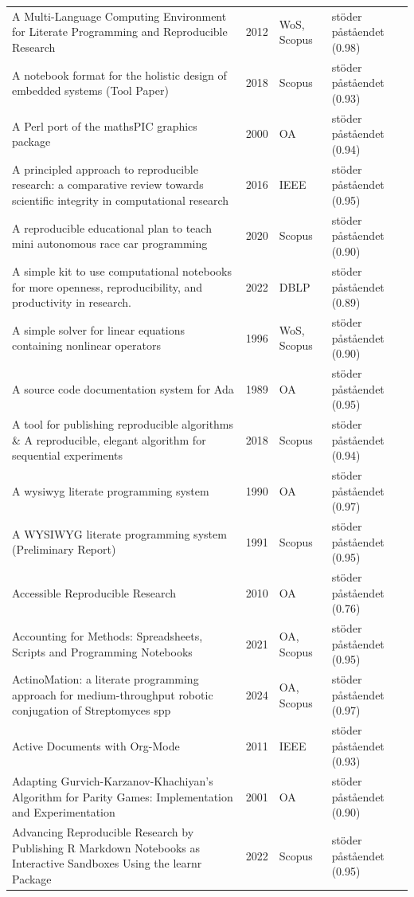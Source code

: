 \begin{longtable}{@{}%
  >{\raggedright\arraybackslash}p{}c%
  >{\raggedright\arraybackslash}p{}%
  >{\raggedright\arraybackslash}p{}@{}}
A Multi-Language Computing Environment for Literate Programming and Reproducible Research & 2012 & WoS, Scopus & stöder påståendet (0.98) \\
A notebook format for the holistic design of embedded systems (Tool Paper) & 2018 & Scopus & stöder påståendet (0.93) \\
A Perl port of the mathsPIC graphics package & 2000 & OA & stöder påståendet (0.94) \\
A principled approach to reproducible research: a comparative review towards scientific integrity in computational research & 2016 & IEEE & stöder påståendet (0.95) \\
A reproducible educational plan to teach mini autonomous race car programming & 2020 & Scopus & stöder påståendet (0.90) \\
A simple kit to use computational notebooks for more openness, reproducibility, and productivity in research. & 2022 & DBLP & stöder påståendet (0.89) \\
A simple solver for linear equations containing nonlinear operators & 1996 & WoS, Scopus & stöder påståendet (0.90) \\
A source code documentation system for Ada & 1989 & OA & stöder påståendet (0.95) \\
A tool for publishing reproducible algorithms \& A reproducible, elegant algorithm for sequential experiments & 2018 & Scopus & stöder påståendet (0.94) \\
A wysiwyg literate programming system & 1990 & OA & stöder påståendet (0.97) \\
A WYSIWYG literate programming system (Preliminary Report) & 1991 & Scopus & stöder påståendet (0.95) \\
Accessible Reproducible Research & 2010 & OA & stöder påståendet (0.76) \\
Accounting for Methods: Spreadsheets, Scripts and Programming Notebooks & 2021 & OA, Scopus & stöder påståendet (0.95) \\
ActinoMation: a literate programming approach for medium-throughput robotic conjugation of Streptomyces spp & 2024 & OA, Scopus & stöder påståendet (0.97) \\
Active Documents with Org-Mode & 2011 & IEEE & stöder påståendet (0.93) \\
Adapting Gurvich-Karzanov-Khachiyan's Algorithm for Parity Games: Implementation and Experimentation & 2001 & OA & stöder påståendet (0.90) \\
Advancing Reproducible Research by Publishing R Markdown Notebooks as Interactive Sandboxes Using the learnr Package & 2022 & Scopus & stöder påståendet (0.95) \\

\end{longtable}
